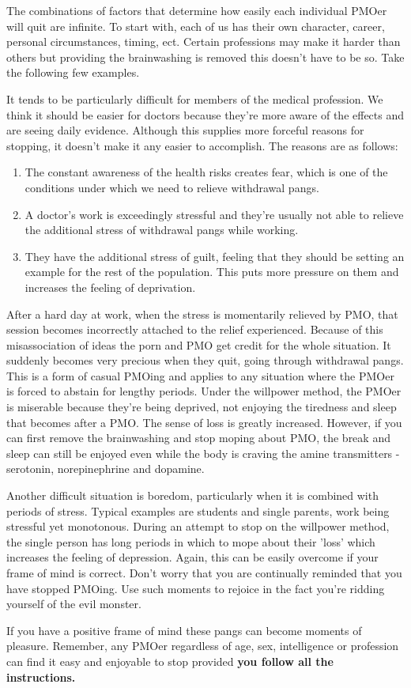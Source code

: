 \documentclass[easypeasy.tex]{subfiles}
\begin{document}
The combinations of factors that determine how easily each individual PMOer will quit are infinite. To start with, each of us has their own character, career, personal circumstances, timing, ect. Certain professions may make it harder than others but providing the brainwashing is removed this doesn't have to be so. Take the following few examples.

It tends to be particularly difficult for members of the medical profession. We think it should be easier for doctors because they're more aware of the effects and are seeing daily evidence. Although this supplies more forceful reasons for stopping, it doesn't make it any easier to accomplish. The reasons are as follows:
  \begin{enumerate}
  \item The constant awareness of the health risks creates fear, which is one of the conditions under which we need to relieve withdrawal pangs.

  \item A doctor's work is exceedingly stressful and they're usually not able to relieve the additional stress of withdrawal pangs while working.

  \item They have the additional stress of guilt, feeling that they should be setting an example for the rest of the population. This puts more pressure on them and increases the feeling of deprivation.
\end{enumerate}
After a hard day at work, when the stress is momentarily relieved by PMO, that session becomes incorrectly attached to the relief experienced. Because of this misassociation of ideas the porn and PMO get credit for the whole situation. It suddenly becomes very precious when they quit, going through withdrawal pangs. This is a form of casual PMOing and applies to any situation where the PMOer is forced to abstain for lengthy periods. Under the willpower method, the PMOer is miserable because they're being deprived, not enjoying the tiredness and sleep that becomes after a PMO. The sense of loss is greatly increased. However, if you can first remove the brainwashing and stop moping about PMO, the break and sleep can still be enjoyed even while the body is craving the amine transmitters - serotonin, norepinephrine and dopamine.

Another difficult situation is boredom, particularly when it is combined with periods of stress. Typical examples are students and single parents, work being stressful yet monotonous. During an attempt to stop on the willpower method, the single person has long periods in which to mope about their 'loss' which increases the feeling of depression. Again, this can be easily overcome if your frame of mind is correct. Don't worry that you are continually reminded that you have stopped PMOing. Use such moments to rejoice in the fact you're ridding yourself of the evil monster.

If you have a positive frame of mind these pangs can become moments of pleasure. Remember, any PMOer regardless of age, sex, intelligence or profession can find it easy and enjoyable to stop provided \textbf{you follow all the instructions.}
\end{document}
